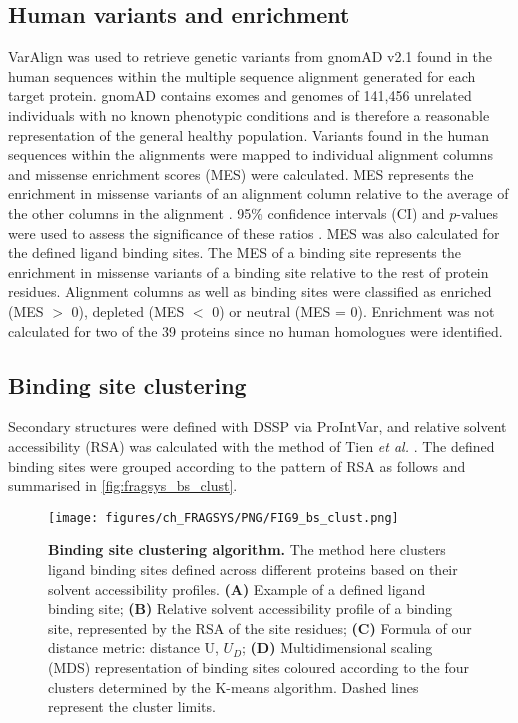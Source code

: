 \subsection{Human variants and enrichment}

VarAlign \cite{MACGOWAN_2020_DRSASP} was used to retrieve genetic variants from gnomAD v2.1 \cite{KARCZEWSKI_2020_GNOMAD} found in the human sequences within the multiple sequence alignment generated for each target protein. gnomAD contains exomes and genomes of 141,456 unrelated individuals with no known phenotypic conditions and is therefore a reasonable representation of the general healthy population. Variants found in the human sequences within the alignments were mapped to individual alignment columns and missense enrichment scores (MES) were calculated. MES represents the enrichment in missense variants of an alignment column relative to the average of the other columns in the alignment \cite{MACGOWAN_2017_VARIANTS, MACGOWAN_2024_VARIANTS}. 95\% confidence intervals (CI) and $p$-values were used to assess the significance of these ratios \cite{SZUMILAS_2010_ODDSRATIOS}. MES was also calculated for the defined ligand binding sites. The MES of a binding site represents the enrichment in missense variants of a binding site relative to the rest of protein residues. Alignment columns as well as binding sites were classified as enriched (MES $>$ 0), depleted (MES $<$ 0) or neutral (MES = 0). Enrichment was not calculated for two of the 39 proteins since no human homologues were identified.

\subsection{Binding site clustering}

Secondary structures were defined with DSSP \cite{KABSCH_1983_DSSP} via ProIntVar, and relative solvent accessibility (RSA) was calculated with the method of  Tien \textit{et al.} \cite{TIEN_2013_RSA}. The defined binding sites were grouped according to the pattern of RSA as follows and summarised in \autoref{fig:fragsys_bs_clust}.

\begin{figure}[ht!]
    \centering
    \texttt{[image: figures/ch\_FRAGSYS/PNG/FIG9\_bs\_clust.png]}
    \caption[Binding site clustering algorithm]{\textbf{Binding site clustering algorithm.} The method here clusters ligand binding sites defined across different proteins based on their solvent accessibility profiles. \textbf{(A)} Example of a defined ligand binding site; \textbf{(B)} Relative solvent accessibility profile of a binding site, represented by the RSA of the site residues; \textbf{(C)} Formula of our distance metric: distance U, $U_{D}$; \textbf{(D)} Multidimensional scaling (MDS) representation of binding sites coloured according to the four clusters determined by the K-means algorithm. Dashed lines represent the cluster limits.}
    \label{fig:fragsys_bs_clust}
\end{figure}

